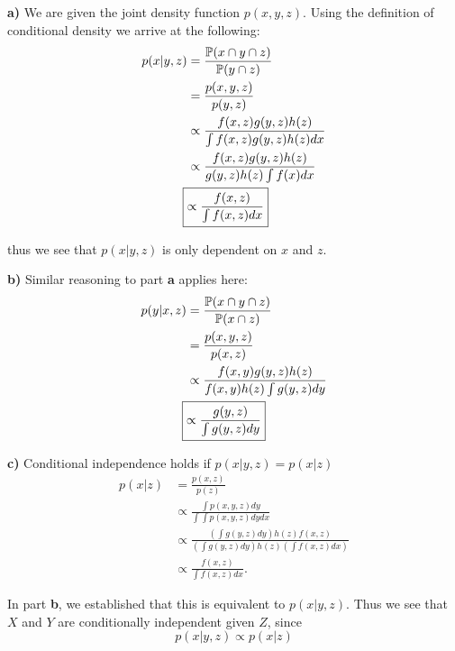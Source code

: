 \documentclass[titlepage, 12pt, leqno]{article}
\begin{document}
\textbf{a)} We are given the joint density function $p(x,y,z)$. Using the definition of conditional density we arrive at the following:
\begin{align*}
    p(x|y,z) &= \frac{\mathbb{P}(x \cap y \cap z)}{\mathbb{P}(y \cap z)} \\
             &= \frac{p(x,y,z)}{p(y,z)} \\
             &\propto \frac{f(x,z)g(y,z)h(z)}{\int f(x,z)g(y,z)h(z)dx}\\
             &\propto \frac{f(x,z)g(y,z)h(z)}{g(y,z)h(z)\int f(x)dx}\\
    \Aboxed{&\propto \frac{f(x,z)}{\int f(x,z)dx}} 
\end{align*}

thus we see that $p(x|y,z)$ is only dependent on $x$ and $z$.

\textbf{b)} Similar reasoning to part \textbf{a} applies here:
\begin{align*}
    p(y|x,z) &= \frac{\mathbb{P}(x \cap y \cap z)}{\mathbb{P}(x \cap z)} \\
             &= \frac{p(x,y,z)}{p(x,z)} \\
             &\propto \frac{f(x,y)g(y,z)h(z)}{f(x,y)h(z)\int g(y,z)dy} \\
     \Aboxed{&\propto \frac{g(y,z)}{\int g(y,z)dy}}
\end{align*}

\textbf{c)} Conditional independence holds if $p(x|y,z) = p(x|z)$
\begin{align*}
    p(x|z) &= \frac{p(x,z)}{p(z)}\\
           &\propto \frac{\int p(x,y,z)dy}{\int \int p(x,y,z)dydx}\\
           &\propto \frac{(\int g(y,z)dy)h(z)f(x,z)}{(\int g(y,z)dy)
           h(z)(\int f(x,z)dx)} \\
           &\propto \frac{f(x,z)}{\int f(x,z)dx}.
\end{align*}

In part \textbf{b}, we established that this is equivalent to $p(x|y,z)$. Thus
we see that $X$ and $Y$ are conditionally independent given $Z$, since
\[
    \boxed{p(x|y,z) \propto p(x|z)} 
\]

\pagebreak
\end{document}

